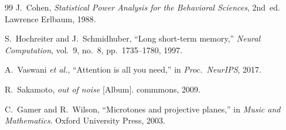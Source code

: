 \documentclass[11pt,a4paper]{article}
\begin{document}
\begin{thebibliography}{99}
J.~Cohen, \emph{Statistical Power Analysis for the Behavioral Sciences},
2nd~ed. Lawrence Erlbaum, 1988.

S.~Hochreiter and J.~Schmidhuber, ``Long short-term memory,''
\emph{Neural Computation}, vol.~9, no.~8, pp.~1735--1780, 1997.

A.~Vaswani \emph{et al.}, ``Attention is all you need,'' in
\emph{Proc.\ NeurIPS}, 2017.

R.~Sakamoto, \emph{out of noise} [Album]. commmons, 2009.

C.~Gamer and R.~Wilson, ``Microtones and projective planes,'' in
\emph{Music and Mathematics}. Oxford University Press, 2003.

\end{thebibliography}
\end{document}

